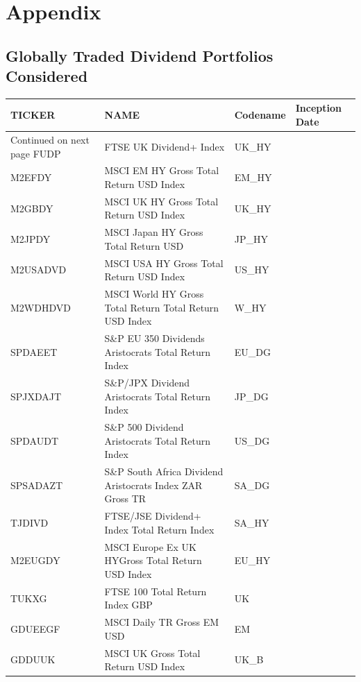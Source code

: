 \documentclass[12pt,preprint, authoryear]{elsarticle}
\numberwithin{equation}{section}
\numberwithin{figure}{section}
\numberwithin{table}{section}
\begin{document}
\newpage

\hypertarget{appendix}{%
\section{Appendix}\label{appendix}}

\hypertarget{globally-traded-dividend-portfolios-considered}{%
\subsection{Globally Traded Dividend Portfolios
Considered}\label{globally-traded-dividend-portfolios-considered}}

\begingroup\fontsize{8pt}{9pt}\selectfont
\begin{longtable}{llll}
  \toprule
TICKER & NAME & Codename & Inception Date \\ 
  \hline 
\endhead 
\hline 
{\footnotesize Continued on next page} 
\endfoot 
\endlastfoot 
 \midrule
FUDP & FTSE UK Dividend+ Index & UK\_HY &  \\ 
  M2EFDY & MSCI EM HY Gross Total Return USD Index & EM\_HY &  \\ 
  M2GBDY & MSCI UK HY Gross Total Return USD Index & UK\_HY &  \\ 
  M2JPDY & MSCI Japan HY Gross Total Return USD & JP\_HY &  \\ 
  M2USADVD & MSCI USA HY Gross Total Return USD Index & US\_HY &  \\ 
  M2WDHDVD & MSCI World HY Gross Total Return Total Return USD Index & W\_HY &  \\ 
  SPDAEET & S\&P EU 350 Dividends Aristocrats Total Return Index & EU\_DG &  \\ 
  SPJXDAJT & S\&P/JPX Dividend Aristocrats Total Return Index & JP\_DG &  \\ 
  SPDAUDT & S\&P 500 Dividend Aristocrats Total Return Index & US\_DG &  \\ 
  SPSADAZT & S\&P South Africa Dividend Aristocrats Index ZAR Gross TR & SA\_DG &  \\ 
  TJDIVD & FTSE/JSE Dividend+ Index Total Return Index & SA\_HY &  \\ 
  M2EUGDY & MSCI Europe Ex UK HYGross Total Return USD Index & EU\_HY &  \\ 
  TUKXG & FTSE 100 Total Return Index GBP & UK &  \\ 
  GDUEEGF & MSCI Daily TR Gross EM USD & EM &  \\ 
  GDDUUK & MSCI UK Gross Total Return USD Index & UK\_B &  \\ 

\end{longtable}
\end{document}
